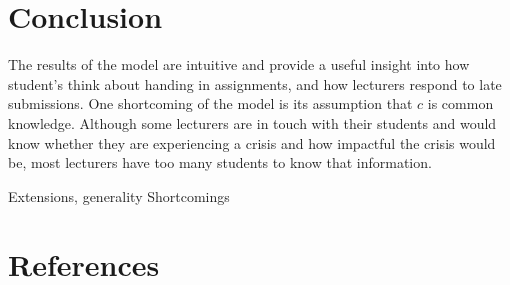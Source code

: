 \documentclass[11pt,preprint, authoryear]{elsarticle}
\numberwithin{equation}{section}
\numberwithin{figure}{section}
\numberwithin{table}{section}
\begin{document}
\hypertarget{conclusion}{%
\section{\texorpdfstring{Conclusion
\label{con}}{Conclusion }}\label{conclusion}}

The results of the model are intuitive and provide a useful insight into
how student's think about handing in assignments, and how lecturers
respond to late submissions. One shortcoming of the model is its
assumption that \(c\) is common knowledge. Although some lecturers are
in touch with their students and would know whether they are
experiencing a crisis and how impactful the crisis would be, most
lecturers have too many students to know that information.

Extensions, generality Shortcomings

\newpage

\hypertarget{references}{%
\section*{References}\label{references}}
\end{document}
